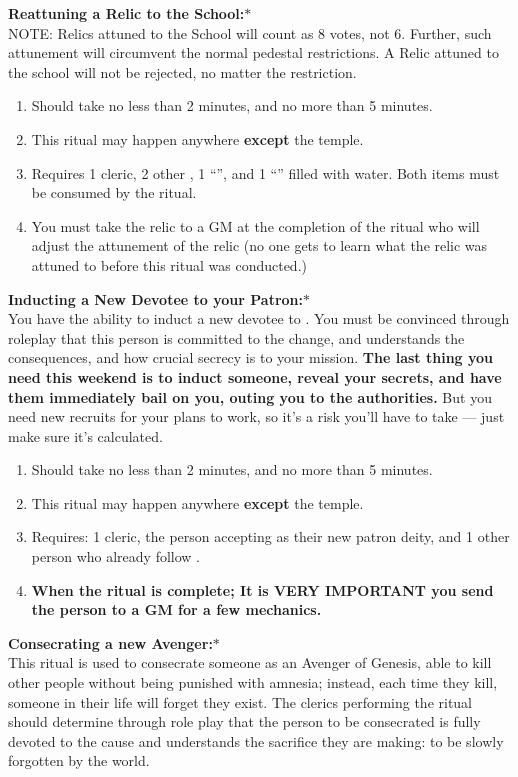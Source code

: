 \documentclass[green]{GL2020}
\begin{document}
\textbf{Reattuning a Relic to the School:}$*$\\
NOTE: Relics attuned to the School will count as 8 votes, not 6. Further, such attunement will circumvent the normal pedestal restrictions. A Relic attuned to the school will not be rejected, no matter the restriction.
  \begin{enumerate}
    \item Should take no less than 2 minutes, and no more than 5 minutes.
    \item This ritual may happen anywhere \textbf{except} the temple.
    \item Requires 1 cleric, 2 other \pGoaties{}, 1 ``\iRitualCandle{}'', and 1 ``\iGlassVial{}'' filled with water.  Both items must be consumed by the ritual.
    \item You must take the relic to a GM at the completion of the ritual who will adjust the attunement of the relic (no one gets to learn what the relic was attuned to before this ritual was conducted.)
  \end{enumerate}
   
\textbf{Inducting a New Devotee to your Patron:}$*$\\
You have the ability to induct a new devotee to \cGenesis{}. You must be convinced through roleplay that this person is committed to the change, and understands the consequences, and how crucial secrecy is to your mission. \textbf{The last thing you need this weekend is to induct someone, reveal your secrets, and have them immediately bail on you, outing you to the authorities.} But you need new recruits for your plans to work, so it's a risk you’ll have to take — just make sure it’s calculated.
  \begin{enumerate}
    \item Should take no less than 2 minutes, and no more than 5 minutes.
    \item This ritual may happen anywhere \textbf{except} the temple.
    \item Requires: 1 cleric, the person accepting \cGenesis{} as their new patron deity, and 1 other person who already follow \cGenesis{}.
	\item \textbf{When the ritual is complete; It is VERY IMPORTANT you send the person to a GM for a few mechanics.}
  \end{enumerate}
  
\textbf{Consecrating a new Avenger:}$*$\\
This ritual is used to consecrate someone as an Avenger of Genesis, able to kill other people without being punished with amnesia; instead, each time they kill, someone in their life will forget they exist. The clerics performing the ritual should determine through role play that the person to be consecrated is fully devoted to the cause and understands the sacrifice they are making: to be slowly forgotten by the world.
\end{document}
